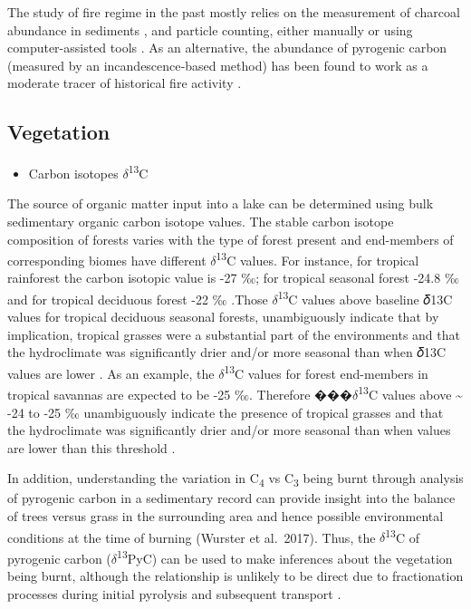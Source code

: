 \documentclass[
  12pt,
]{book}
\providecommand{\tightlist}{%
  \setlength{\itemsep}{0pt}\setlength{\parskip}{0pt}}
\begin{document}
The study of fire regime in the past mostly relies on the measurement of charcoal abundance in sediments \citep{higueraPeakDetectionSediment2010}, and particle counting, either manually \citep{aliComparingFirehistoryInterpretations2009} or using computer-assisted tools \citep{conederaReconstructingFireRegimes2009a}. As an alternative, the abundance of pyrogenic carbon (measured by an incandescence‐based method) has been found to work as a moderate tracer of historical fire activity \citep{chellmanIncandescencebasedSingleparticleMethod2018}.

\hypertarget{backveg}{%
\subsection{Vegetation}\label{backveg}}

\begin{itemize}
\tightlist
\item
  Carbon isotopes \(\delta\)\textsuperscript{13}C
\end{itemize}

The source of organic matter input into a lake can be determined using bulk sedimentary organic carbon isotope values. The stable carbon isotope composition of forests varies with the type of forest present and end-members of corresponding biomes have different \(\delta\)\textsuperscript{13}C values. For instance, for tropical rainforest the carbon isotopic value is -27 ‰; for tropical seasonal forest -24.8 ‰ and for tropical deciduous forest -22 ‰ \citep{diefendorfGlobalPatternsLeaf2010}.Those \(\delta\)\textsuperscript{13}C values above baseline 𝛿13C values for tropical deciduous seasonal forests, unambiguously indicate that by implication, tropical grasses were a substantial part of the environments and that the hydroclimate was significantly drier and/or more seasonal than when 𝛿13C values are lower \citep{wursterSavannaEquatorialBorneo2019}. As an example, the \(\delta\)\textsuperscript{13}C values for forest end-members in tropical savannas are expected to be -25 ‰. Therefore ���\(\delta\)\textsuperscript{13}C values above \textasciitilde{} -24 to -25 ‰ unambiguously indicate the presence of tropical grasses and that the hydroclimate was significantly drier and/or more seasonal than when values are lower than this threshold \citep{diefendorfGlobalPatternsLeaf2010}.

In addition, understanding the variation in C\textsubscript{4} vs C\textsubscript{3} being burnt through analysis of pyrogenic carbon in a sedimentary record can provide insight into the balance of trees versus grass in the surrounding area and hence possible environmental conditions at the time of burning (Wurster et al.~2017). Thus, the \(\delta\)\textsuperscript{13}C of pyrogenic carbon (\(\delta\)\textsuperscript{13}PyC) can be used to make inferences about the vegetation being burnt, although the relationship is unlikely to be direct due to fractionation processes during initial pyrolysis and subsequent transport \citep{saizPyrogenicCarbonTropical2015}.
\end{document}
